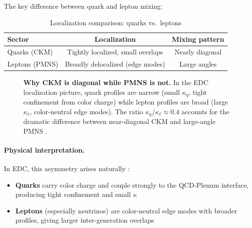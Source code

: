 The key difference between quark and lepton mixing:

\begin{table}[ht]
\centering
\caption{Localization comparison: quarks vs.\ leptons}
\label{tab:ch7_quark_lepton}
\begin{tabular}{lcc}
\toprule
\textbf{Sector} & \textbf{Localization} & \textbf{Mixing pattern} \\
\midrule
Quarks (CKM) & Tightly localized, small overlaps & Nearly diagonal \\
Leptons (PMNS) & Broadly delocalized (edge modes) & Large angles \\
\bottomrule
\end{tabular}
\end{table}

\begin{figure}[htbp]
\centering
{}
\caption{\textbf{Why CKM is diagonal while PMNS is not.}
In the EDC localization picture, quark profiles are narrow (small $\kappa_q$, tight
confinement from color charge) while lepton profiles are broad (large $\kappa_\ell$,
color-neutral edge modes). The ratio $\kappa_q/\kappa_\ell \approx 0.4$ accounts
for the dramatic difference between near-diagonal CKM and large-angle PMNS \tagI{}.}
\label{fig:ch7_ckm_vs_pmns_localization}
\end{figure}

\paragraph{Physical interpretation.}
In EDC, this asymmetry arises naturally \tagP{}:
\begin{itemize}[nosep]
    \item \textbf{Quarks} carry color charge and couple strongly to the
          QCD-Plenum interface, producing tight confinement and small $\kappa$
    \item \textbf{Leptons} (especially neutrinos) are color-neutral edge modes
          with broader profiles, giving larger inter-generation overlaps
\end{itemize}

